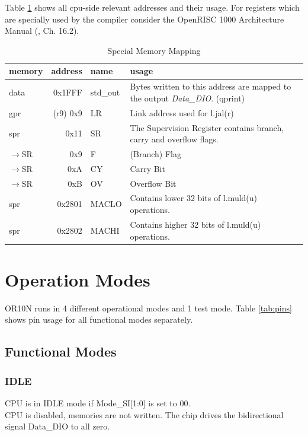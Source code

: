 Table \ref{tab:mem_map} shows all cpu-side relevant addresses and their usage. For registers which are specially used by the compiler consider the OpenRISC 1000 Architecture Manual (\cite{or1000}, Ch. 16.2).
\begin{table}[htbp]
 \caption{Special Memory Mapping}
 \label{tab:mem_map}
\centering\begin{tabular}{|l|r|l|p{9cm}|} \hline
memory & address & name & usage \\ \hline
data & 0x1FFF & std\_out & Bytes written to this address are mapped to the output \textit{Data\_DIO}. (qprint) \\ \hline
\gls{gpr} & (r9) 0x9 & LR & Link address used for l.jal(r) \\ \hline
\gls{spr} & 0x11 & SR & The Supervision Register contains branch, carry and overflow flags. \\
$\rightarrow$SR & 0x9 & F & (Branch) Flag \\
$\rightarrow$SR & 0xA & CY & Carry Bit \\
$\rightarrow$SR & 0xB & OV & Overflow Bit \\ \hline
\gls{spr} & 0x2801 & MACLO & Contains lower 32 bits of l.muld(u) operations. \\ \hline
\gls{spr} & 0x2802 & MACHI & Contains higher 32 bits of l.muld(u) operations. \\ \hline

 \end{tabular}
\end{table}



\clearpage

\section{Operation Modes}
\label{sec:mode}
OR10N runs in 4 different operational modes and 1 test mode. Table \ref{tab:pins} shows pin usage for all functional modes separately.
\subsection{Functional Modes}
\subsubsection{IDLE}
CPU is in IDLE mode if Mode\_SI[1:0] is set to 00.\\
CPU is disabled, memories are not written. The chip drives the bidirectional signal Data\_DIO to all zero.
